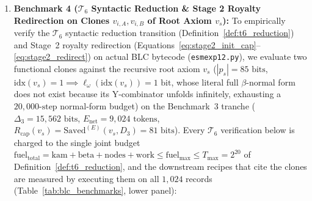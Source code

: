 \documentclass[runningheads,a4paper]{llncs}
\renewcommand{\_}{\textunderscore\allowbreak}
\begin{document}
\begin{enumerate}
  \item \textbf{Benchmark 4 ($\mathcal{T}_6$ Syntactic Reduction \& Stage 2 Royalty Redirection on Clones $v_{i,A},\allowbreak v_{i,B}$ of Root Axiom $v_s$):} To empirically verify the $\mathcal{T}_6$ syntactic reduction transition (Definition~\ref{def:t6_reduction}) and Stage~2 royalty redirection (Equations~\eqref{eq:stage2_init_cap}--\eqref{eq:stage2_redirect}) on actual BLC bytecode (\texttt{esm\_exp1\_2.py}), we evaluate two functional clones against the recursive root axiom $v_s$ ($|p_s| = 85\text{ bits}$, $\text{idx}(v_s) = 1 \implies \ell_\omega(\text{idx}(v_s)) = 1\text{ bit}$, whose literal full $\beta$-normal form does not exist because its Y-combinator unfolds infinitely, exhausting a $20,000\text{-step}$ normal-form budget) on the Benchmark~3 tranche ($\Delta_3 = 15,562\text{ bits}$, $E_{\text{net}} = 9,024\text{ tokens}$, $R_{\text{cap}}(v_s) = \text{Saved}^{(E)}(v_s,\allowbreak D_3) = 81\text{ bits}$). Every $\mathcal{T}_6$ verification below is charged to the single joint budget $\text{fuel}_{\text{total}} = \text{kam} + \text{beta} + \text{nodes} + \text{work} \le \text{fuel}_{\max} \le T_{\max} = 2^{20}$ of Definition~\ref{def:t6_reduction}, and the downstream recipes that cite the clones are measured by executing them on all $1,024$ records (Table~\ref{tab:blc_benchmarks}, lower panel):
  \begin{itemize}

\end{itemize}
\end{enumerate}
\end{document}

